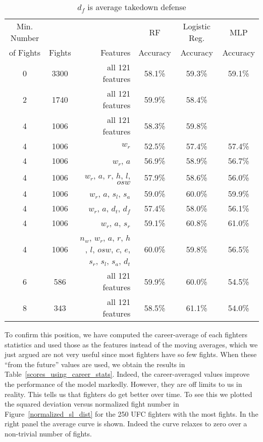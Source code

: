 \begin{center}
\begin{table}[h]
\begin{tabular}{ccr|ccc}
\toprule
Min. Number &        &         & RF        & Logistic Reg. & MLP      \\
of Fights & Fights & Features & Accuracy & Accuracy      & Accuracy\\
\hline
0  & 3300 & all 121 features & 58.1\% & 59.3\% & 59.1\% \\
2  & 1740 & all 121 features & 59.9\% & 58.4\% &  \\
4  & 1006 & all 121 features & 58.3\% & 59.8\% &   \\
4  & 1006 & $w_r$ & 52.5\% & 57.4\% & 57.4\%  \\
4  & 1006 & $w_r$, $a$ & 56.9\% & 58.9\% & 56.7\%  \\
4  & 1006 & $w_r$, $a$, $r$, $h$, $l$, $osw$ & 57.9\% & 58.6\% & 56.0\%\\
4  & 1006 & $w_r$, $a$, $s_l$, $s_a$ & 59.0\% & 60.0\% & 59.9\%  \\
4  & 1006 & $w_r$, $a$, $d_t$, $d_f$ & 57.4\% & 58.0\% & 56.1\%  \\
4  & 1006 & $w_r$, $a$, $s_r$ & 59.1\% & 60.8\% & 61.0\%  \\
4  & 1006 & $n_w$, $w_r$, $a$, $r$, $h$, $l$, $osw$, $c$, $e$, $s_r$, $s_l$, $s_a$, $d_t$ & 60.0\% & 59.8\% & 56.5\%  \\
6  &  586 & all 121 features & 59.9\% & 60.0\% & 54.5\% \\
8  &  343 & all 121 features & 58.5\% & 61.1\% & 54.0\% \\
\bottomrule
\end{tabular}
\caption{$d_f$ is average takedown defense}
\label{other_features_with_min}
\end{table}
\end{center}

To confirm this position, we have computed the career-average of
each fighters statistics and  used those as the features instead
of the moving averages, which we just argued are not very useful
since most fighters have so few fights. When these ``from the future''
values are used, we obtain the results
in Table~\ref{scores_using_career_stats}. Indeed, the career-averaged
values improve the performance of the model markedly. However, they
are off limits to us in reality. This tells us that fighters do
get better over time. To see this we plotted the squared deviation
versus normalized fight number in Figure~\ref{normalized_sl_dist}
for the 250 UFC fighters with the most fights. In the right panel
the average curve is shown. Indeed the curve relaxes to zero over
a non-trivial number of fights.

